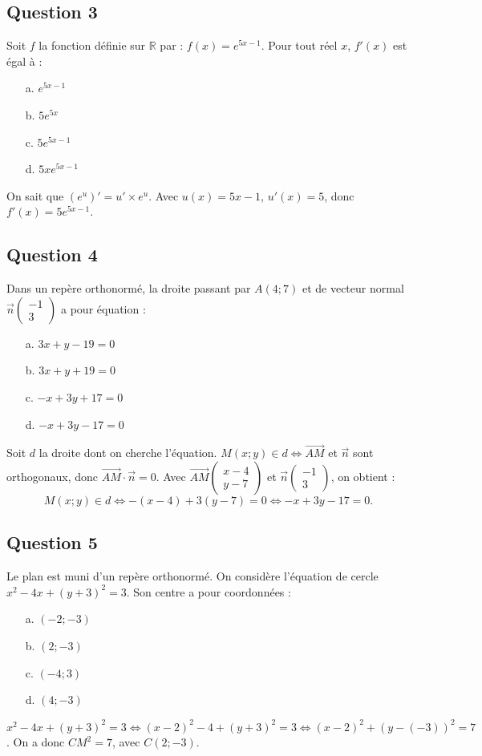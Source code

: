 \documentclass[10pt]{article}
\begin{document}
	\subsection*{Question 3}
	Soit $f$ la fonction définie sur $\mathbb{R}$ par : $f(x) = e^{5x-1}$. Pour tout réel $x$, $f'(x)$ est égal à :
	
	\begin{itemize}
		\item[a.] $e^{5x-1}$
		\item[b.] $5e^{5x}$
		\item[c.] $5e^{5x-1}$
		\item[d.] $5xe^{5x-1}$
	\end{itemize}
	
	On sait que $(e^u)' = u' \times e^u$. Avec $u(x) = 5x - 1$, $u'(x) = 5$, donc $f'(x) = 5e^{5x-1}$.
	
	\subsection*{Question 4}
	Dans un repère orthonormé, la droite passant par $A(4; 7)$ et de vecteur normal $\vec{n}\left( \begin{array}{c}
		-1 \\
		3 \end{array} \right)$ a pour équation :
	
	\begin{itemize}
		\item[a.] $3x + y - 19 = 0$
		\item[b.] $3x + y + 19 = 0$
		\item[c.] $-x + 3y + 17 = 0$
		\item[d.] $-x + 3y - 17 = 0$
	\end{itemize}
	
	Soit $d$ la droite dont on cherche l’équation. $M(x ; y) \in d \Leftrightarrow \overrightarrow{AM}$ et $\vec{n}$ sont orthogonaux, donc $\overrightarrow{AM} \cdot \vec{n} = 0$. Avec $\overrightarrow{AM} \left( \begin{array}{c}
		x-4 \\
		y-7 \end{array} \right)$ et $\vec{n} \left( \begin{array}{c}
		-1 \\
		3 \end{array} \right)$, on obtient :
	\[ M(x ; y) \in d \Leftrightarrow -(x - 4) + 3(y - 7) = 0 \Leftrightarrow -x + 3y - 17 = 0. \]
	
	\subsection*{Question 5}
	Le plan est muni d’un repère orthonormé. On considère l’équation de cercle $x^2 - 4x + (y + 3)^2 = 3$. Son centre a pour coordonnées :
	
	\begin{itemize}
		\item[a.] $(-2 ; -3)$
		\item[b.] $(2 ; -3)$
		\item[c.] $(-4 ; 3)$
		\item[d.] $(4 ; -3)$
	\end{itemize}
	
	$x^2 - 4x + (y + 3)^2 = 3 \Leftrightarrow (x - 2)^2 - 4 + (y + 3)^2 = 3 \Leftrightarrow (x - 2)^2 + (y - (-3))^2 = 7$. On a donc $CM^2 = 7$, avec $C(2 ; -3)$.
\end{document}
